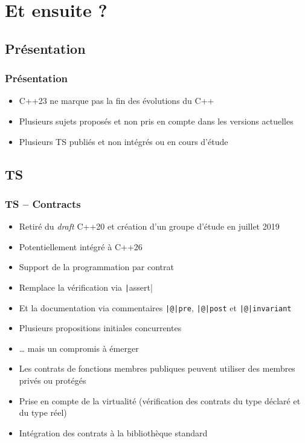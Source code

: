 \documentclass[C++.tex]{subfiles}
\begin{document}
\section{Et ensuite ?}
\subsection*{Présentation}
\begin{frame}[fragile]
	\frametitle{Présentation}
	\begin{itemize}
		\item C++23 ne marque pas la fin des évolutions du C++
		\item Plusieurs sujets proposés et non pris en compte dans les versions actuelles
		\item Plusieurs TS publiés et non intégrés ou en cours d'étude
	\end{itemize}
\end{frame}

\subsection*{TS}
\begin{frame}[fragile]
	\frametitle{TS -- Contracts}
	\begin{itemize}
		\item Retiré du \textit{draft} C++20 et création d'un groupe d'étude en juillet 2019
		\item Potentiellement intégré à C++26
		\item Support de la programmation par contrat
		\item Remplace la vérification via \texttt|assert|
		\item Et la documentation via commentaires \texttt{|@|pre}, \texttt{|@|post} et \texttt{|@|invariant}
		\item Plusieurs propositions initiales concurrentes
		\item \ldots{} mais un compromis à émerger
		\item Les contrats de fonctions membres publiques peuvent utiliser des membres privés ou protégés
		\item Prise en compte de la virtualité (vérification des contrats du type déclaré et du type réel)
		\item Intégration des contrats à la bibliothèque standard
	\end{itemize}

\end{frame}
\end{document}

